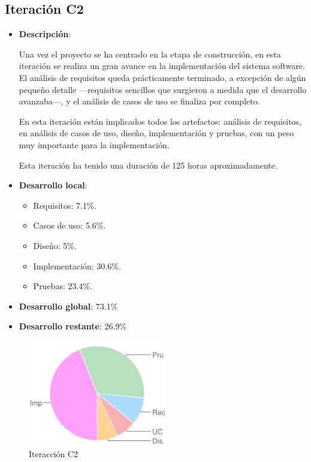\subsection*{Iteración C2}

\begin{itemize}    
\item {\bf Descripción}:

Una vez el proyecto se ha centrado en la etapa de construcción, en esta iteración se realiza un gran avance en la implementación del sistema software. El análisis de requisitos queda prácticamente terminado, a excepción de algún pequeño detalle ---requisitos sencillos que surgieron a medida que el desarrollo avanzaba---, y el análisis de casos de uso se finaliza por completo.

En esta iteración están implicados todos los artefactos: análisis de requisitos, en análisis de casos de uso, diseño, implementación y pruebas, con un peso muy importante para la implementación.

Esta iteración ha tenido una duración de 125 horas aproximadamente.
\end{itemize}

\begin{minipage}[c]{0.45\linewidth}
  \begin{itemize}    
  \item {\bf Desarrollo local}:
    \begin{itemize}
    \item Requisitos: 7.1\%.
    \item Casos de uso: 5.6\%.
    \item Diseño: 5\%.
    \item Implementación: 30.6\%.
    \item Pruebas: 23.4\%.
    \end{itemize}
  \item {\bf Desarrollo global}: 73.1\%
  \item {\bf Desarrollo restante}: 26.9\%
  \end{itemize}
\end{minipage}
\begin{minipage}[c]{0.45\linewidth}
  \begin{figure}[H]
    \begin{center}
      \includegraphics[width=6cm]{images/c2.png}

      \caption{Iteracción C2}
      \label{fig::c2}
    \end{center}
  \end{figure}
\end{minipage}

